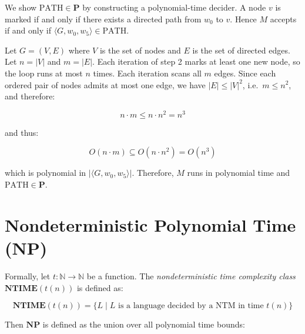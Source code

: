 \documentclass[12pt,a4paper,openany]{article}
\begin{document}
\begin{center}
\end{center}

We show $\text{PATH} \in \mathbf{P}$ by constructing a polynomial-time decider.
A node $v$ is marked if and only if there exists a directed path from $w_0$ to $v$. Hence $M$ accepts if and only if
$\langle G, w_0, w_5 \rangle \in \text{PATH}$.

Let $G = (V, E)$ where $V$ is the set of nodes and $E$ is the set of directed edges. Let $n = |V|$ and $m = |E|$.
Each iteration of step 2 marks at least one new node, so the loop runs at most $n$ times. Each iteration scans all $m$ edges. Since each ordered pair of nodes admits at most one edge, we have $|E| \leq |V|^2$, i.e.\ $m \leq n^2$, and therefore:

\[
n \cdot m \leq n \cdot n^2 = n^3
\]

and thus:

\[
O(n \cdot m) \subseteq O(n \cdot n^2) = O(n^3)
\]

which is polynomial in $|\langle G, w_0, w_5 \rangle|$. Therefore, $M$ runs in polynomial time and $\text{PATH} \in \mathbf{P}$.

\section{Nondeterministic Polynomial Time (NP)}

Formally, let $t : \mathbb{N} \to \mathbb{N}$ be a function. The \emph{nondeterministic time complexity class} $\mathbf{NTIME}(t(n))$ is defined as:

\[
\mathbf{NTIME}(t(n)) = \{ L \mid L \text{ is a language decided by a NTM in time } t(n) \}
\]

Then $\mathbf{NP}$ is defined as the union over all polynomial time bounds:
\end{document}
